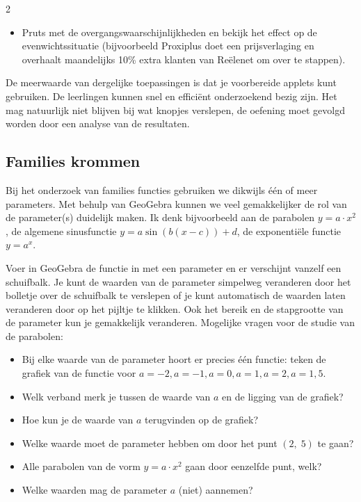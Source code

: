 \begin{multicols}{2}

\begin{itemize}
\item Pruts met de overgangswaarschijnlijkheden en bekijk het effect op de evenwichtssituatie (bijvoorbeeld Proxiplus doet een prijsverlaging en overhaalt maandelijks 10\% extra klanten van Reëlenet om over te stappen).
\end{itemize} 

 De meerwaarde van dergelijke toepassingen is dat je voorbereide applets kunt gebruiken. De leerlingen kunnen snel en efficiënt onderzoekend bezig zijn. Het mag natuurlijk niet blijven bij wat knopjes verslepen, de oefening moet gevolgd worden door een analyse van de resultaten.

\subsection{Families krommen}
Bij het onderzoek van families functies gebruiken we dikwijls één of meer parameters. Met behulp van GeoGebra kunnen we veel gemakkelijker de rol van de parameter(s) duidelijk maken.  Ik denk bijvoorbeeld aan de parabolen $y=a \cdot x^2$, de algemene sinusfunctie $y=a \sin (b(x-c))+d$, de exponentiële functie $y=a^x$.
	
Voer in GeoGebra de functie in met een parameter en er verschijnt vanzelf een schuifbalk. Je kunt de waarden van de parameter simpelweg veranderen door het bolletje over de schuifbalk te verslepen of je kunt automatisch de waarden laten veranderen door op het pijltje te klikken. Ook het bereik en de stapgrootte van de parameter kun je gemakkelijk veranderen.
Mogelijke vragen voor de studie van de parabolen:
\begin{itemize}
	\item Bij elke waarde van de parameter hoort er precies één functie: teken de grafiek van de functie voor $a=-2, a=-1, a=0, a=1, a=2, a=1,5$.
	\item	Welk verband merk je tussen de waarde van $a$ en de ligging van de grafiek?
	\item Hoe kun je de waarde van $a$ terugvinden op de grafiek?
	\item	Welke waarde moet de parameter hebben om door het punt $(2,\;5)$ te gaan?
	\item Alle parabolen van de vorm $y=a \cdot x^2$ gaan door eenzelfde punt, welk?
	\item	Welke waarden mag de parameter $a$ (niet) aannemen?
	\end{itemize}


\end{multicols}
